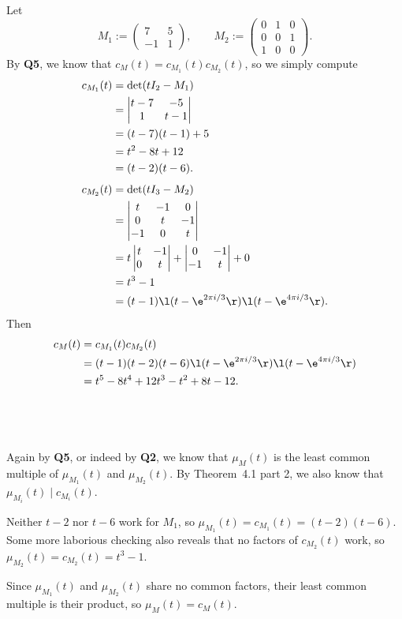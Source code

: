 \documentclass[a4paper]{article}
\begin{document}
Let \[
M_1 := \begin{pmatrix}
7 & 5 \\
-1 & 1
\end{pmatrix}, \qquad
M_2 := \begin{pmatrix}
0 & 1 & 0 \\
0 & 0 & 1 \\
1 & 0 & 0
\end{pmatrix}.
\] By \textbf{Q5}, we know that $c_M(t) = c_{M_1}(t) c_{M_2}(t)$, so we simply compute
\begin{align*}
c_{M_1}(t) &= \det(t I_2 - M_1) \\
&= \begin{vmatrix}
t - 7 & -5 \\
1 & t - 1
\end{vmatrix} \\
&= (t - 7) (t - 1) + 5 \\
&= t^2 - 8t + 12 \\
&= (t - 2) (t - 6). \\[1ex]
c_{M_2}(t) &= \det(t I_3 - M_2) \\
&= \begin{vmatrix}
t & -1 & 0 \\
0 & t & -1 \\
-1 & 0 & t
\end{vmatrix} \\
&= t \begin{vmatrix}
t & -1 \\
0 & t
\end{vmatrix}
+ \begin{vmatrix}
0 & -1 \\
-1 & t
\end{vmatrix}
+ 0 \\
&= t^3 - 1 \\
&= (t - 1) \l( t - \e^{2\pi i / 3} \r) \l( t - \e^{4\pi i / 3} \r).
\end{align*}
Then
\begin{align*}
c_M(t) &= c_{M_1}(t) c_{M_2}(t) \\
&= (t - 1) (t - 2) (t - 6) \l( t - \e^{2\pi i / 3} \r) \l( t - \e^{4\pi i / 3} \r) \\
&= t^5 - 8 t^4 + 12 t^3 - t^2 + 8t - 12.
\end{align*}

\subsection{~} %

Again by \textbf{Q5}, or indeed by \textbf{Q2}, we know that $\mu_M(t)$ is the least common multiple of $\mu_{M_1}(t)$ and $\mu_{M_2}(t)$. By Theorem~4.1 part 2, we also know that $\mu_{M_i}(t) \mid c_{M_i}(t)$.

Neither $t - 2$ nor $t - 6$ work for $M_1$, so $\mu_{M_1}(t) = c_{M_1}(t) = (t - 2) (t - 6)$. Some more laborious checking also reveals that no factors of $c_{M_2}(t)$ work, so $\mu_{M_2}(t) = c_{M_2}(t) = t^3 - 1$.

Since $\mu_{M_1}(t)$ and $\mu_{M_2}(t)$ share no common factors, their least common multiple is their product, so $\mu_M(t) = c_M(t)$.

\end{document}
